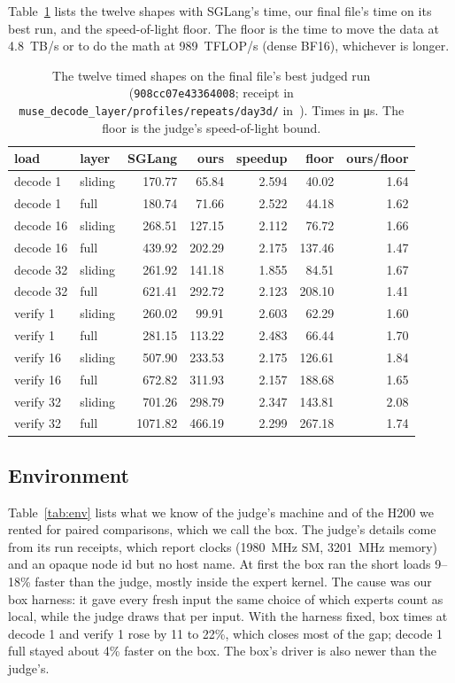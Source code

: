 \documentclass[11pt]{article}
\begin{document}
Table~\ref{tab:cells} lists the twelve shapes with SGLang's time, our final file's
time on its best run, and the speed-of-light floor. The floor is the time to move
the data at \SI{4.8}{TB/s} or to do the math at \SI{989}{TFLOP/s} (dense BF16),
whichever is longer.

\begin{table}[t]
\centering
\caption{The twelve timed shapes on the final file's best judged run
(\texttt{908cc07e43364008}; receipt in
\texttt{muse\_decode\_layer/profiles/repeats/day3d/} in~\cite{repo}). Times in
\si{\micro\second}. The floor is the judge's speed-of-light bound.}
\label{tab:cells}
\small
\begin{tabular}{llrrrrr}
\toprule
load & layer & SGLang & ours & speedup & floor & ours/floor\\
\midrule
decode 1  & sliding &  170.77 &  65.84 & 2.594 &  40.02 & 1.64\\
decode 1  & full    &  180.74 &  71.66 & 2.522 &  44.18 & 1.62\\
decode 16 & sliding &  268.51 & 127.15 & 2.112 &  76.72 & 1.66\\
decode 16 & full    &  439.92 & 202.29 & 2.175 & 137.46 & 1.47\\
decode 32 & sliding &  261.92 & 141.18 & 1.855 &  84.51 & 1.67\\
decode 32 & full    &  621.41 & 292.72 & 2.123 & 208.10 & 1.41\\
verify 1  & sliding &  260.02 &  99.91 & 2.603 &  62.29 & 1.60\\
verify 1  & full    &  281.15 & 113.22 & 2.483 &  66.44 & 1.70\\
verify 16 & sliding &  507.90 & 233.53 & 2.175 & 126.61 & 1.84\\
verify 16 & full    &  672.82 & 311.93 & 2.157 & 188.68 & 1.65\\
verify 32 & sliding &  701.26 & 298.79 & 2.347 & 143.81 & 2.08\\
verify 32 & full    & 1071.82 & 466.19 & 2.299 & 267.18 & 1.74\\
\bottomrule
\end{tabular}
\end{table}

\subsection{Environment}

Table~\ref{tab:env} lists what we know of the judge's machine and of the H200 we
rented for paired comparisons, which we call the box. The judge's details come
from its run receipts, which report clocks (\SI{1980}{\mega\hertz} SM,
\SI{3201}{\mega\hertz} memory) and an opaque node id but no host name. At first
the box ran the short loads 9--18\% faster than the judge, mostly inside the
expert kernel. The cause was our box harness: it gave every fresh input the same
choice of which experts count as local, while the judge draws that per input.
With the harness fixed, box times at decode 1 and verify 1 rose by 11 to 22\%,
which closes most of the gap; decode 1 full stayed about 4\% faster on the box.
The box's driver is also newer than the judge's.
\end{document}
